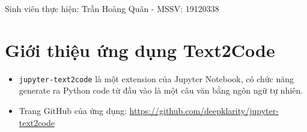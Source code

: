 \documentclass[12pt]{article}
\begin{document}







	
	

\noindent Sinh viên thực hiện: Trần Hoàng Quân - MSSV: 19120338

\section{Giới thiệu ứng dụng Text2Code}
\begin{itemize}
\item \texttt{jupyter-text2code} là một extension của Jupyter Notebook, có chức năng generate ra Python code từ đầu vào là một câu văn bằng ngôn ngữ tự nhiên. 
\item Trang GitHub của ứng dụng: \href{https://github.com/deepklarity/jupyter-text2code}{https://github.com/deepklarity/jupyter-text2code}
\end{itemize}
\end{document}
